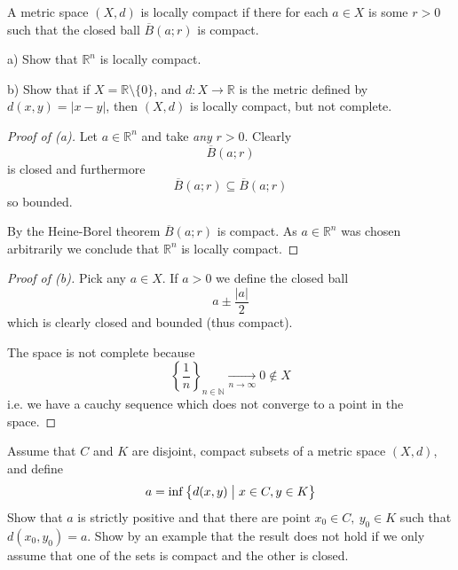 \begin{prob}
    A metric space $(X,d)$ is locally compact if there for each 
    $a \in X$ is some $r > 0$ such that the closed ball 
    $\overline B(a;r)$ is compact. 

    a) Show that $\mathbb R^n$ is locally compact. 

    b) Show that if $X = \mathbb R \setminus \{0\}$, and 
    $d: X \to \mathbb R$ is the metric defined by $d(x,y) = |x-y|$, 
    then $(X,d)$ is locally compact, but not complete.  
\end{prob}
\begin{proof}[Proof of (a)]
    Let $a \in \mathbb R^n$ and take \emph{any} $r > 0$. 
    Clearly 
    \[
        \overline B(a;r)
    \]
    is closed and furthermore 
    \[
        \overline B(a;r) \subseteq \overline B(a;r)
    \]
    so bounded. 
    
    By the Heine-Borel theorem $\overline B(a;r)$ is compact. 
    As $a \in \mathbb R^n$ was chosen arbitrarily we conclude 
    that $\mathbb R^n$ is locally compact. 
\end{proof}
\begin{proof}[Proof of (b)]
    Pick any $a \in X$. If $a > 0$ we define the closed ball 
    \[
        a \pm \frac{|a|}{2} 
    \]
    which is clearly closed and bounded (thus compact). 

    The space is not complete because 
    \[
        \left\{\frac{1}{n}\right\}_{n\in\mathbb N} 
        \underset{n \to \infty}{\to} 0 \not\in X
    \]
    i.e. we have a cauchy sequence which does not converge 
    to a point in the space. 
\end{proof}
\begin{prob}
    Assume that $C$ and $K$ are disjoint, compact subsets of a 
    metric space $(X,d)$, and define 
    \[
        a = \inf\left\{ d(x,y) \bigm| x \in C, y \in K \right\}
    \]
    Show that $a$ is strictly positive and that there 
    are point $x_0 \in C, \: y_0 \in K$ such that 
    $d(x_0, y_0) = a$. Show by an example that the result 
    does not hold if we only assume that one of the sets is compact 
    and the other is closed. 
\end{prob}
